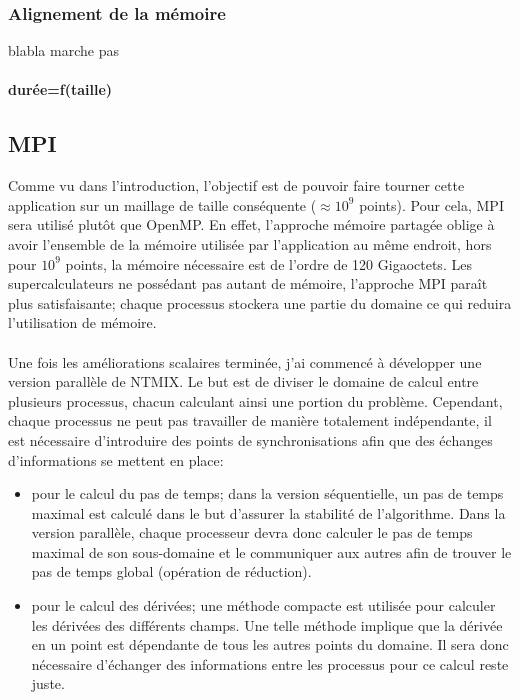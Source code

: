 \subsubsection{Alignement de la mémoire}
blabla marche pas

\paragraph{durée=f(taille)}

\subsection{MPI}
Comme vu dans l'introduction, l'objectif est de pouvoir faire tourner cette application sur un maillage de taille conséquente ($\approx 10^9$ points). Pour cela, MPI sera utilisé plutôt que OpenMP. En effet, l'approche mémoire partagée oblige à avoir l'ensemble de la mémoire utilisée par l'application au même endroit, hors pour $10^9$ points, la mémoire nécessaire est de l'ordre de 120 Gigaoctets. Les supercalculateurs ne possédant pas autant de mémoire, l'approche MPI paraît plus satisfaisante; chaque processus stockera une partie du domaine ce qui reduira l'utilisation de mémoire.


\paragraph{}Une fois les améliorations scalaires terminée, j'ai commencé à développer une version parallèle de NTMIX. Le but est de diviser le domaine de calcul entre plusieurs processus, chacun calculant ainsi une portion du problème. Cependant, chaque processus ne peut pas travailler de manière totalement indépendante, il est nécessaire d'introduire des points de synchronisations afin que des échanges d'informations se mettent en place:


\begin{itemize}
\item pour le calcul du pas de temps; dans la version séquentielle, un pas de temps maximal est calculé dans le but d'assurer la stabilité de l'algorithme. Dans la version parallèle, chaque processeur devra donc calculer le pas de temps maximal de son sous-domaine et le communiquer aux autres afin de trouver le pas de temps global (opération de réduction).
\item pour le calcul des dérivées; une méthode compacte est utilisée pour calculer les dérivées des différents champs. Une telle méthode implique que la dérivée en un point est dépendante de tous les autres points du domaine. Il sera donc nécessaire d'échanger des informations entre les processus pour ce calcul reste juste.
\end{itemize}


